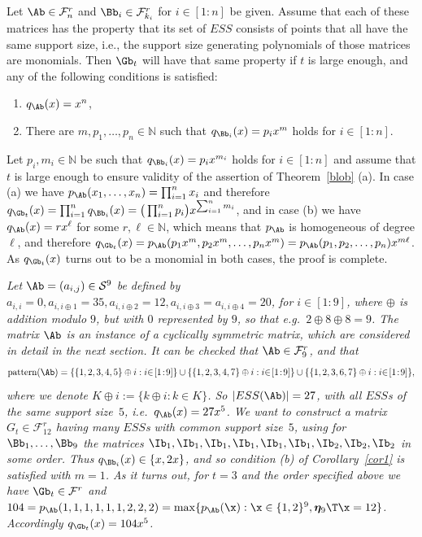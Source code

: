 \documentclass[moor]{informs3}              %
\def\irg#1#2{{ \in\! [{#1}\! : \! {#2}]}}
\begin{document}
\begin{cly}\label{cor1}
Let $\Ab\in\mathcal{F}^r_n$ and $\Bb_i\in\mathcal{F}^r_{k_i}$ for $i\irg 1n$ be given. Assume that each of these matrices has the property that its set of $ESS$ consists of points that all have the same support size, i.e., the
support size generating polynomials of those matrices are monomials. Then $\Gb_t$ will have that same property if $t$ is large enough, and any of the following conditions is satisfied:
\begin{enumerate}
  \item [(a)] $q_\Ab(x)=x^n$,
  \item [(b)] There are $m,p_1,\ldots,p_n\in\mathbb{N}$ such that $q_{\Bb_i}(x)=p_ix^m$ holds for $i\irg 1n$.
\end{enumerate}
\end{cly}
\bep
Let $p_i,m_i\in\mathbb{N}$ be such that $q_{\Bb_i}(x)=p_ix^{m_i}$ holds for $i\irg 1n$ and assume that $t$ is large enough to ensure validity of the assertion of Theorem~\ref{blob} (a). In case (a) we have $p_\Ab(x_1,\ldots,x_n)=\prod_{i=1}^nx_i$ and therefore
$q_{\Gb_t}(x)=\prod_{i=1}^nq_{\Bb_i}(x)=\big(\prod_{i=1}^np_i\big)x^{\sum_{i=1}^nm_i}$, and in case (b) we have $q_\Ab(x)=rx^\ell$ for some $r,\ell\in\mathbb{N}$, which means that $p_\Ab$ is homogeneous of degree $\ell$,
and therefore
$q_{\Gb_t}(x)=p_\Ab(p_1x^m,p_2x^m,\ldots,p_nx^m)=p_\Ab(p_1,p_2,\ldots,p_n)x^{m\ell}$. As $q_{\Gb_t}(x)$ turns out to be a monomial in both cases, the proof is complete.
\ep
\begin{exa}
\label{example:11}
\emph{Let $\Ab=(a_{i,j})\in{\mathcal S}^9$ be defined by $a_{i,i}=0, a_{i,i\oplus1}=35, a_{i,i\oplus2}=12, a_{i,i\oplus3}=a_{i,i\oplus4}=20$, for $i\irg 19$, where $\oplus$ is addition modulo $9$, but with $0$ represented by $9$, so that e.g.~$2\oplus8\oplus8=9$. The matrix $\Ab$ is an instance of a \emph{cyclically symmetric matrix}, which are considered in detail in the next section. It can be checked that $\Ab\in{\mathcal F}^r_9$, and that
$$\textup{pattern}(\Ab)=\{\{1,2,3,4,5\}\oplus i:i\irg 19\}\cup\{\{1,2,3,4,7\}\oplus i:i\irg 19\}
\cup\{\{1,2,3,6,7\}\oplus i:i\irg 19\},$$
where we denote $K\oplus i:=\{k\oplus i:k\in K\}$. So $|ESS(\Ab)|=27$, with all $ESS$s of the same support size~$5$, i.e.~$q_\Ab(x)=27x^5$. We want to construct
a matrix $G_t\in{\mathcal F}^r_{12}$ having many $ESS$s with common support size~$5$, using for $\Bb_1,\ldots,\Bb_9$ the matrices $\Ib_1,\Ib_1,\Ib_1,\Ib_1,\Ib_1,\Ib_1,\Ib_2,\Ib_2,\Ib_2$ in some order. Thus  $q_{\Bb_i}(x)\in\{x,2x\}$,
and so condition (b) of Corollary~\ref{cor1} is satisfied with $m=1$.
As it turns out, for $t=3$ and the order specified above we have $\Gb_t\in\mathcal{F}^r$ and $104=p_{\Ab}(1,1,1,1,1,1,2,2,2)=
\max\{p_{\Ab}(\x):\x\in\{1,2\}^9,\bm{\eta}_{9}\T\x=12\}$.
Accordingly $q_{\Gb_t}(x)=104x^5$.}
\end{exa}
\end{document}
